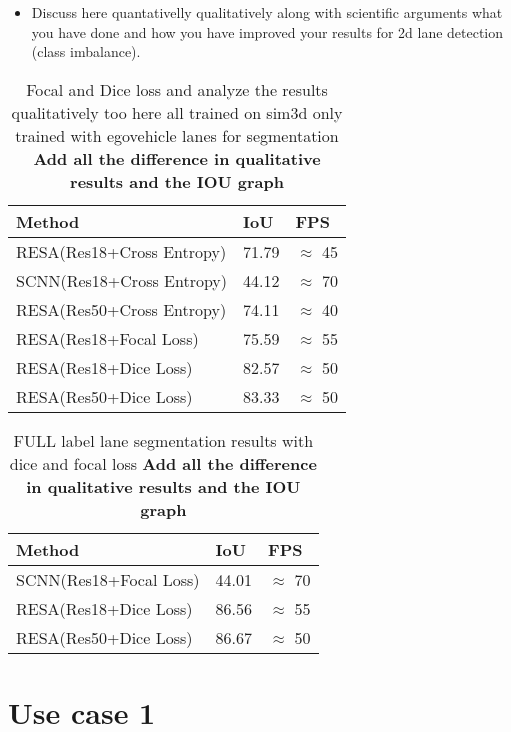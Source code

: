 \begin{itemize}
     \item Discuss here quantativelly qualitatively along with scientific arguments what you have done and how you have improved your results for 2d lane detection (class imbalance).
\end{itemize}
     \begin{table}[h!]
    \caption{Focal and Dice loss and analyze the results qualitatively too here all trained on sim3d only trained with egovehicle lanes for segmentation \textbf{Add all the difference in qualitative results and the IOU graph}}
    \centering
    \begin{tabular}{|l|l|l|}
    \hline
        \textbf{Method} & \textbf{IoU} & \textbf{FPS} \\ \hline
        RESA(Res18+Cross Entropy) & 71.79 & $\approx$ 45 \\ \hline
        SCNN(Res18+Cross Entropy) & 44.12 & $\approx$ 70  \\ \hline
        RESA(Res50+Cross Entropy) & 74.11 & $\approx$ 40  \\ \hline
        RESA(Res18+Focal Loss) & 75.59 & $\approx$ 55 \\\hline
        RESA(Res18+Dice Loss) & 82.57 & $\approx$ 50 \\\hline
        RESA(Res50+Dice Loss) & 83.33 & $\approx$ 50 \\\hline
    \end{tabular}
\end{table}
    
    
     \begin{table}[h!]
    \caption{FULL label lane segmentation results with dice and focal loss \textbf{Add all the difference in qualitative results and the IOU graph}}
    \centering
    \begin{tabular}{|l|l|l|}
    \hline
        \textbf{Method} & \textbf{IoU} & \textbf{FPS} \\ \hline
        SCNN(Res18+Focal Loss) & 44.01 & $\approx$ 70 \\\hline
        RESA(Res18+Dice Loss) & 86.56 & $\approx$ 55 \\\hline
        RESA(Res50+Dice Loss) & 86.67 & $\approx$ 50 \\\hline
    \end{tabular}
\end{table}

    \section{Use case 1}

